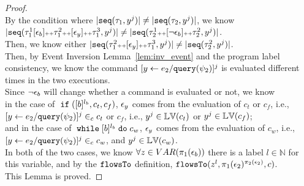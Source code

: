 \begin{proof}
\\
By the condition where $|\mathtt{seq}(\mathtt{\tau}_1, y^j)| \neq |\mathtt{seq}(\mathtt{\tau}_2, y^j)|$, 
we know 
\\
 $|\mathtt{seq}(\mathtt{\tau}_1^1 [\mathtt{\epsilon}_b] {\scriptscriptstyle ++}  \mathtt{\tau}_1^2 {\scriptscriptstyle ++} [\mathtt{\epsilon}_y] {\scriptscriptstyle ++} \mathtt{\tau}_1^3, y^j)| \neq 
 |\mathtt{seq}(\mathtt{\tau}^1_2 {\scriptscriptstyle ++} [\neg\mathtt{\epsilon}_b] {\scriptscriptstyle ++}  \mathtt{\tau}^2_2, y^j)|$.
 \\
 Then, we know either 
 $|\mathtt{seq}(\mathtt{\tau}_1^2 {\scriptscriptstyle ++} [\mathtt{\epsilon}_y] {\scriptscriptstyle ++} \mathtt{\tau}_1^3, y^j)| \neq 
 |\mathtt{seq}(\mathtt{\tau}^2_2, y^j)|$.
\\
Then, by Event Inversion Lemma~\ref{lem:inv_event} and the program label consistency, we know the
command $[\mathrel{ y \leftarrow e_2 / {\tt query}(\psi_2) }]^{j}$ is evaluated different times in the two executions.
\\
Since $\neg\mathtt{\epsilon}_b$ will change whether a command is evaluated or not, we know 
\\
in the case of $\;\mathtt{if}\; ([b]^{l_b}, c_t, c_f)$, $\mathtt{\epsilon}_y$ comes from the evaluation of $c_t$ or $c_f$,
i.e., $[\mathrel{ y \leftarrow e_2 / {\tt query}(\psi_2) }]^{j} \in_c c_t$ or $c_f$, i.e., $y^j \in \mathbb{LV}(c_t)$ or $y^j \in \mathbb{LV}(c_f)$;
\\
and in the case of $\;\mathtt{while}\; [b]^{l_b} \;\mathtt{do}\; c_w$, $\mathtt{\epsilon}_y$ comes from the evaluation of $c_w$,
i.e., $[\mathrel{ y \leftarrow e_2 / {\tt query}(\psi_2) }]^{j} \in_c c_w$, and $y^j \in \mathbb{LV}(c_w)$.
\\
In both of the two cases, we know $\forall z \in VAR(\pi_1(\mathtt{\epsilon}_b)) $ there is a label $l \in \mathbb{N}$ for this variable,
and by the $\mathtt{flowsTo}$ definition, 
$\mathtt{flowsTo}(z^l, \pi_1(\mathtt{\epsilon}_2)^{\pi_2(\mathtt{\epsilon}_2)},c)$.
\\
This Lemma is proved.
\end{proof}
